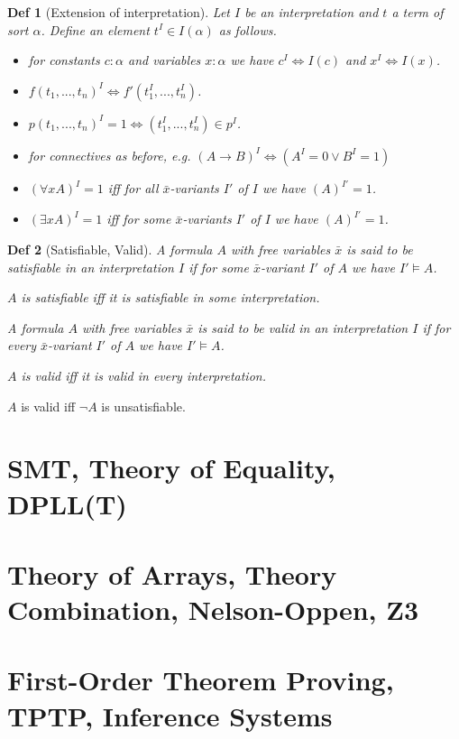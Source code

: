 \documentclass[]{article}
\newtheorem*{definition*}{Def}
\begin{document}
\begin{definition*}[Extension of interpretation]
	Let $I$ be an interpretation and $t$ a term of sort $\alpha$. Define an element $t^I \in I(\alpha)$ as follows.
	\begin{itemize}
		\item for constants $c: \alpha$ and variables $x: \alpha$ we have $c^I \iff I(c)$ and $x^I \iff I(x)$.
		\item $f(t_1,...,t_n)^I \iff f'(t_1^I,...,t_n^I)$.
		\item $p(t_1,...,t_n)^I = 1 \iff (t_1^I,...,t_n^I) \in p^I$.
		\item for connectives as before, e.g. $(A\rightarrow B)^I \iff (A^I = 0 \lor B^I = 1)$
		\item $(\forall x A)^I = 1$ iff for all $\bar{x}$-variants $I'$ of $I$ we have $(A)^{I'} = 1$.
		\item $(\exists x A)^I = 1$ iff for some $\bar{x}$-variants $I'$ of $I$ we have $(A)^{I'} = 1$.
	\end{itemize}
\end{definition*}

\begin{definition*}[Satisfiable, Valid]
	A formula $A$ with free variables $\bar{x}$ is said to be satisfiable in an interpretation $I$ if for some $\bar{x}$-variant $I'$ of $A$ we have $I' \models A$.
	
	$A$ is satisfiable iff it is satisfiable in some interpretation.
	
	A formula $A$ with free variables $\bar{x}$ is said to be valid in an interpretation $I$ if for every $\bar{x}$-variant $I'$ of $A$ we have $I' \models A$.
	
	$A$ is valid iff it is valid in every interpretation.
\end{definition*}

$A$ is valid iff $\lnot A$ is unsatisfiable.

\section{SMT, Theory of Equality, DPLL(T)}

\section{Theory of Arrays, Theory Combination, Nelson-Oppen, Z3}

\section{First-Order Theorem Proving, TPTP, Inference Systems}
\end{document}
